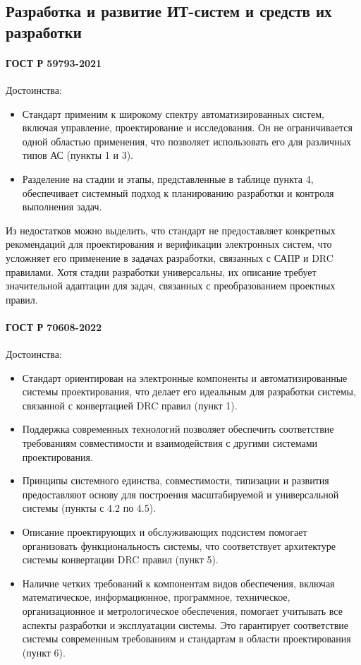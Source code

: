 \subsection{Разработка и развитие ИТ-систем и средств их разработки}

\paragraph{ГОСТ Р 59793-2021}

Достоинства:

\begin{itemize}
	\item Стандарт применим к широкому спектру автоматизированных систем,
		включая управление, проектирование и исследования.
		Он не ограничивается одной областью применения,
		что позволяет использовать его для различных типов АС (пункты 1 и 3).
	\item Разделение на стадии и этапы, представленные в таблице пункта 4,
		обеспечивает системный подход к планированию разработки
		и контроля выполнения задач.
\end{itemize}

Из недостатков можно выделить,
что стандарт не предоставляет конкретных рекомендаций для проектирования
и верификации электронных систем,
что усложняет его применение в задачах разработки,
связанных с САПР и DRC правилами.
Хотя стадии разработки универсальны,
их описание требует значительной адаптации для задач,
связанных с преобразованием проектных правил.

\paragraph{ГОСТ Р 70608-2022}

Достоинства:

\begin{itemize}
	\item Стандарт ориентирован на электронные компоненты
		и автоматизированные системы проектирования,
		что делает его идеальным для разработки системы,
		связанной с конвертацией DRC правил (пункт 1).
	\item Поддержка современных технологий позволяет обеспечить
		соответствие требованиям совместимости
		и взаимодействия с другими системами проектирования.
	\item Принципы системного единства, совместимости, типизации
		и развития предоставляют основу для построения масштабируемой
		и универсальной системы (пункты с 4.2 по 4.5).
	\item Описание проектирующих
		и обслуживающих подсистем помогает организовать
		функциональность системы, что соответствует архитектуре
		системы конвертации DRC правил (пункт 5).
	\item Наличие четких требований к компонентам видов обеспечения,
		включая математическое, информационное, программное, техническое,
		организационное и метрологическое обеспечения,
		помогает учитывать все аспекты разработки и эксплуатации системы.
		Это гарантирует соответствие системы современным требованиям
		и стандартам в области проектирования (пункт 6).
\end{itemize}

